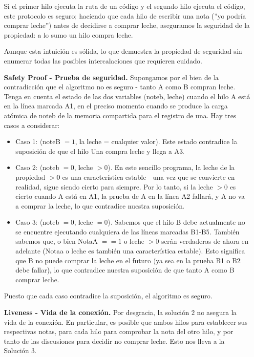 \documentclass[10pt]{book}
\begin{document}
Si el primer hilo ejecuta la ruta de un código y el segundo hilo ejecuta el código, este protocolo es seguro; haciendo que cada hilo de escribir una nota (''yo podría comprar leche'') antes de decidirse a comprar leche, aseguramos la seguridad de la propiedad: a lo sumo un hilo compra leche.

Aunque esta intuición es sólida, lo que demuestra la propiedad de seguridad sin enumerar todas las posibles intercalaciones que  requieren cuidado.

\textbf{Safety Proof - Prueba de seguridad.} Supongamos por el bien de la contradicción que el algoritmo no es seguro - tanto A como B compran leche. Tenga en cuenta el estado de las dos variables (noteb, leche) cuando el hilo A está en la línea marcada A1, en el preciso momento cuando se produce la carga atómica de noteb de la memoria compartida para el registro de una. Hay tres casos a considerar:
\begin{itemize}
\item Caso 1: (noteB $= 1$, la leche = cualquier valor). Este estado contradice la suposición de que el hilo Una compra leche y llega a A3.
\item Caso 2: (noteb $= 0$, leche $> 0$). En este sencillo programa, la leche de la propiedad $> 0$ es una característica estable - una vez que se convierte en realidad, sigue siendo cierto para siempre. Por lo tanto, si la leche $> 0$ es cierto cuando A está en A1, la prueba de A en la línea A2 fallará, y A no va a comprar la leche, lo que contradice nuestra suposición.
\item Caso 3: (noteb $= 0$, leche $= 0$). Sabemos que el hilo B debe actualmente no se encuentre ejecutando cualquiera de las líneas marcadas B1-B5. También sabemos que, o bien NotaA $== 1$ o leche $> 0$ serán verdaderas de ahora en adelante (Notaa o leche es también una característica estable). Esto significa que B no puede comprar la leche en el futuro (ya sea en la prueba B1 o B2 debe fallar), lo que contradice nuestra suposición de que tanto A como B comprar leche.
\end{itemize}

Puesto que cada caso contradice la suposición, el algoritmo es seguro.

\textbf{Liveness - Vida de la conexión.} Por desgracia, la solución 2 no asegura la vida de la conexión. En particular, es posible que ambos hilos para establecer sus respectivas notas, para cada hilo para comprobar la nota del otro hilo, y por tanto de las discusiones para decidir no comprar leche. Esto nos lleva a la Solución 3.
\end{document}
